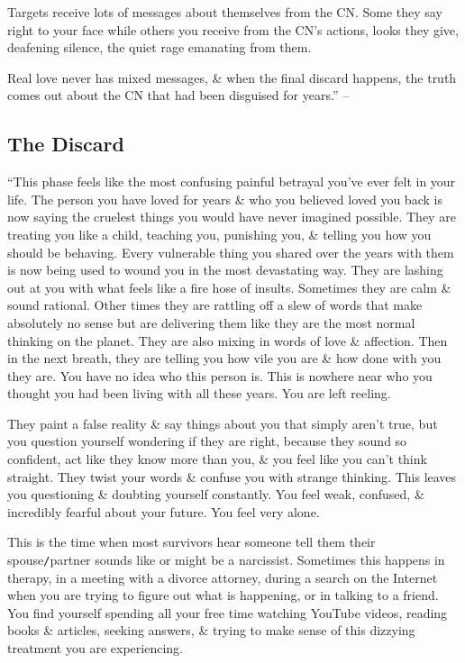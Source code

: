 \documentclass{article}
\numberwithin{equation}{section}
\begin{document}
Targets receive lots of messages about themselves from the CN. Some they say right to your face while others you receive from the CN's actions, looks they give, deafening silence, the quiet rage emanating from them.

Real love never has mixed messages, \& when the final discard happens, the truth comes out about the CN that had been disguised for years.'' -- \cite[pp. 36--40]{Mirza2017}

\subsection{The Discard}
``This phase feels like the most confusing painful betrayal you've ever felt in your life. The person you have loved for years \& who you believed loved you back is now saying the cruelest things you would have never imagined possible. They are treating you like a child, teaching you, punishing you, \& telling you how you should be behaving. Every vulnerable thing you shared over the years with them is now being used to wound you in the most devastating way. They are lashing out at you with what feels like a fire hose of insults. Sometimes they are calm \& sound rational. Other times they are rattling off a slew of words that make absolutely no sense but are delivering them like they are the most normal thinking on the planet. They are also mixing in words of love \& affection. Then in the next breath, they are telling you how vile you are \& how done with you they are. You have no idea who this person is. This is nowhere near who you thought you had been living with all these years. You are left reeling.

They paint a false reality \& say things about you that simply aren't true, but you question yourself wondering if they are right, because they sound so confident, act like they know more than you, \& you feel like you can't think straight. They twist your words \& confuse you with strange thinking. This leaves you questioning \& doubting yourself constantly. You feel weak, confused, \& incredibly fearful about your future. You feel very alone.

This is the time when most survivors hear someone tell them their spouse\texttt{/}partner sounds like or might be a narcissist. Sometimes this happens in therapy, in a meeting with a divorce attorney, during a search on the Internet when you are trying to figure out what is happening, or in talking to a friend. You find yourself spending all your free time watching YouTube videos, reading books \& articles, seeking answers, \& trying to make sense of this dizzying treatment you are experiencing.
\end{document}
